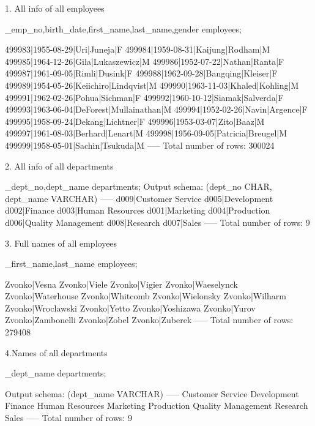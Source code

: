 1. All info of all employees

\project_{emp_no,birth_date,first_name,last_name,gender} employees;

499983|1955-08-29|Uri|Juneja|F
499984|1959-08-31|Kaijung|Rodham|M
499985|1964-12-26|Gila|Lukaszewicz|M
499986|1952-07-22|Nathan|Ranta|F
499987|1961-09-05|Rimli|Dusink|F
499988|1962-09-28|Bangqing|Kleiser|F
499989|1954-05-26|Keiichiro|Lindqvist|M
499990|1963-11-03|Khaled|Kohling|M
499991|1962-02-26|Pohua|Sichman|F
499992|1960-10-12|Siamak|Salverda|F
499993|1963-06-04|DeForest|Mullainathan|M
499994|1952-02-26|Navin|Argence|F
499995|1958-09-24|Dekang|Lichtner|F
499996|1953-03-07|Zito|Baaz|M
499997|1961-08-03|Berhard|Lenart|M
499998|1956-09-05|Patricia|Breugel|M
499999|1958-05-01|Sachin|Tsukuda|M
-----
Total number of rows: 300024

2. All info of all departments

\project_{dept_no,dept_name} departments;
Output schema: (dept_no CHAR, dept_name VARCHAR)
-----
d009|Customer Service
d005|Development
d002|Finance
d003|Human Resources
d001|Marketing
d004|Production
d006|Quality Management
d008|Research
d007|Sales
-----
Total number of rows: 9

3. Full names of all employees

\project_{first_name,last_name} employees;

Zvonko|Vesna
Zvonko|Viele
Zvonko|Vigier
Zvonko|Waeselynck
Zvonko|Waterhouse
Zvonko|Whitcomb
Zvonko|Wielonsky
Zvonko|Wilharm
Zvonko|Wroclawski
Zvonko|Yetto
Zvonko|Yoshizawa
Zvonko|Yurov
Zvonko|Zambonelli
Zvonko|Zobel
Zvonko|Zuberek
-----
Total number of rows: 279408

4.Names of all departments

\project_{dept_name} departments;

Output schema: (dept_name VARCHAR)
-----
Customer Service
Development
Finance
Human Resources
Marketing
Production
Quality Management
Research
Sales
-----
Total number of rows: 9
